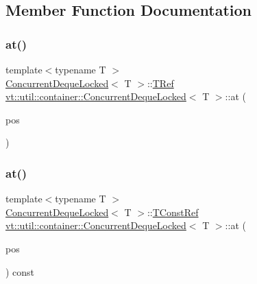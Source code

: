\subsection{Member Function Documentation}
\mbox{\label{structvt_1_1util_1_1container_1_1_concurrent_deque_locked_a0999ea4ff06ed38095d31ed9710e7525}} 
\subsubsection{\texorpdfstring{at()}{at()}\hspace{0.1cm}{\footnotesize\ttfamily [1/2]}}
{\footnotesize\ttfamily template$<$typename T $>$ \\
\hyperlink{structvt_1_1util_1_1container_1_1_concurrent_deque_locked}{Concurrent\+Deque\+Locked}$<$ T $>$\+::\hyperlink{structvt_1_1util_1_1container_1_1_concurrent_deque_locked_a4451b0e7f6c8aa741f98a77a9fed353e}{T\+Ref} \hyperlink{structvt_1_1util_1_1container_1_1_concurrent_deque_locked}{vt\+::util\+::container\+::\+Concurrent\+Deque\+Locked}$<$ T $>$\+::at (\begin{DoxyParamCaption}\item[{\hyperlink{structvt_1_1util_1_1container_1_1_concurrent_deque_locked_a6f35f4923f1329d25378656b0582e916}{Size\+Type} const \&}]{pos }\end{DoxyParamCaption})}

\mbox{\label{structvt_1_1util_1_1container_1_1_concurrent_deque_locked_a5c5a48c3f01f61faa7329c2cbfd92103}} 
\subsubsection{\texorpdfstring{at()}{at()}\hspace{0.1cm}{\footnotesize\ttfamily [2/2]}}
{\footnotesize\ttfamily template$<$typename T $>$ \\
\hyperlink{structvt_1_1util_1_1container_1_1_concurrent_deque_locked}{Concurrent\+Deque\+Locked}$<$ T $>$\+::\hyperlink{structvt_1_1util_1_1container_1_1_concurrent_deque_locked_a9da9776dff836c013a95431f3ab15e35}{T\+Const\+Ref} \hyperlink{structvt_1_1util_1_1container_1_1_concurrent_deque_locked}{vt\+::util\+::container\+::\+Concurrent\+Deque\+Locked}$<$ T $>$\+::at (\begin{DoxyParamCaption}\item[{\hyperlink{structvt_1_1util_1_1container_1_1_concurrent_deque_locked_a6f35f4923f1329d25378656b0582e916}{Size\+Type} const \&}]{pos }\end{DoxyParamCaption}) const}

